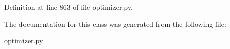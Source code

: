 Definition at line 863 of file optimizer.\-py.



The documentation for this class was generated from the following file\-:\begin{DoxyCompactItemize}
\item 
\hyperlink{optimizer_8py}{optimizer.\-py}\end{DoxyCompactItemize}
